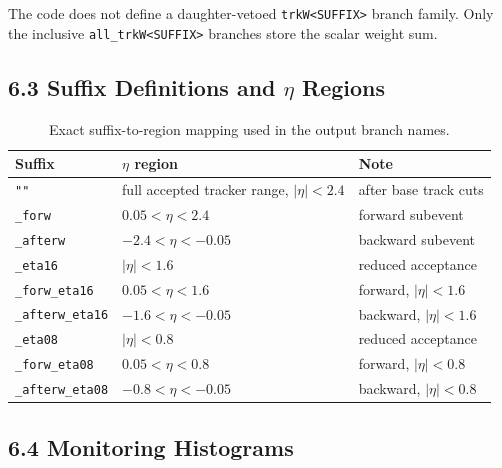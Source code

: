 \documentclass[11pt]{article}
\begin{document}
\noindent
The code does not define a daughter-vetoed \texttt{trkW<SUFFIX>} branch family. Only the
inclusive \texttt{all\_trkW<SUFFIX>} branches store the scalar weight sum.

\subsection*{6.3 Suffix Definitions and $\eta$ Regions}

\begin{table}[h]
\centering
\small
\begin{tabular}{lll}
\toprule
Suffix & $\eta$ region & Note \\
\midrule
\texttt{""} & full accepted tracker range, $|\eta| < 2.4$ & after base track cuts \\
\texttt{\_forw} & $0.05 < \eta < 2.4$ & forward subevent \\
\texttt{\_afterw} & $-2.4 < \eta < -0.05$ & backward subevent \\
\texttt{\_eta16} & $|\eta| < 1.6$ & reduced acceptance \\
\texttt{\_forw\_eta16} & $0.05 < \eta < 1.6$ & forward, $|\eta|<1.6$ \\
\texttt{\_afterw\_eta16} & $-1.6 < \eta < -0.05$ & backward, $|\eta|<1.6$ \\
\texttt{\_eta08} & $|\eta| < 0.8$ & reduced acceptance \\
\texttt{\_forw\_eta08} & $0.05 < \eta < 0.8$ & forward, $|\eta|<0.8$ \\
\texttt{\_afterw\_eta08} & $-0.8 < \eta < -0.05$ & backward, $|\eta|<0.8$ \\
\bottomrule
\end{tabular}
\caption{Exact suffix-to-region mapping used in the output branch names.}
\label{tab:patep-suffix-definitions}
\end{table}

\subsection*{6.4 Monitoring Histograms}
\end{document}
